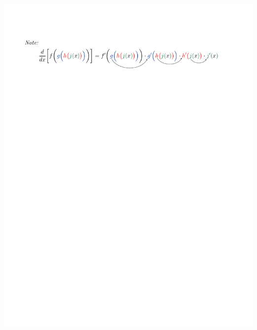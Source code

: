 \documentclass[../mathNotesPreamble]{subfiles}
\begin{document}
  \noindent
  {\centering\includegraphics[width=\textwidth, clip, trim=0.5in 220mm 0.5in 20mm]{chain_rule_ex}}
  
\end{document}
